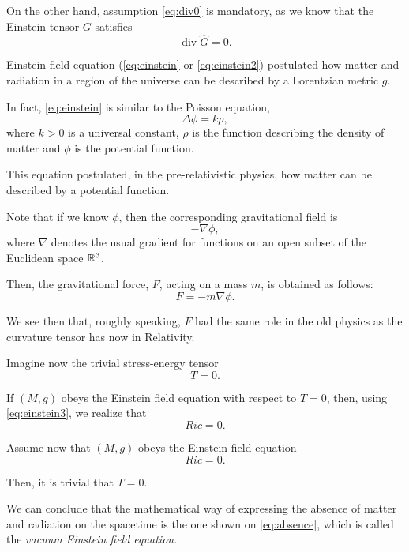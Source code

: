 On the other hand, assumption \ref{eq:div0} is mandatory, as we know that the Einstein tensor $G$ satisfies
\[
	\operatorname{div} \hat{G} = 0.
\]

Einstein field equation (\autoref{eq:einstein} or \autoref{eq:einstein2}) postulated how matter and radiation in a region of the universe can be described by a Lorentzian metric $g$.

In fact, \autoref{eq:einstein} is similar to the Poisson equation,
\[
	\Delta\phi = k\rho,
\]
where $k>0$ is a universal constant, $\rho$ is the function describing the density of matter and $\phi$ is the potential function.

This equation postulated, in the pre-relativistic physics, how matter can be described by a potential function.

Note that if we know $\phi$, then the corresponding gravitational field is 
\[
	-\nabla \phi,
\]
where $\nabla$ denotes the usual gradient for functions on an open subset of the Euclidean space $\mathbb{R}^3$.

Then, the gravitational force, $F$, acting on a mass $m$, is obtained as follows:
\[
	F = -m\nabla\phi.
\]

We see then that, roughly speaking, $F$ had the same role in the old physics as the curvature tensor has now in Relativity.

Imagine now the trivial stress-energy tensor
\[
	T = 0.
\]

If $(M,g)$ obeys the Einstein field equation with respect to $T = 0$, then, using \autoref{eq:einstein3}, we realize that
\[
	Ric = 0.
\]

Assume now that $(M,g)$ obeys the Einstein field equation
\begin{equation}
	\label{eq:absence}
	Ric = 0.
\end{equation}

Then, it is trivial that $T=0$.

We can conclude that the mathematical way of expressing the absence of matter and radiation on the spacetime is the one shown on \autoref{eq:absence}, which is called the \emph{vacuum Einstein field equation}.